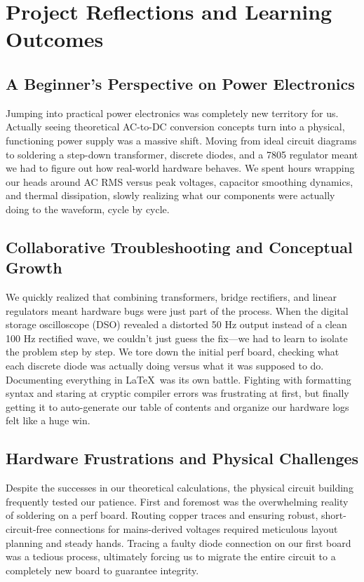 \documentclass[journal,12pt,onecolumn]{IEEEtran}
\begin{document}
		\section{Project Reflections and Learning Outcomes}
		
\subsection{A Beginner's Perspective on Power Electronics}
Jumping into practical power electronics was completely new territory for us. Actually seeing theoretical AC-to-DC conversion concepts turn into a physical, functioning power supply was a massive shift. Moving from ideal circuit diagrams to soldering a step-down transformer, discrete diodes, and a 7805 regulator meant we had to figure out how real-world hardware behaves. We spent hours wrapping our heads around AC RMS versus peak voltages, capacitor smoothing dynamics, and thermal dissipation, slowly realizing what our components were actually doing to the waveform, cycle by cycle.
		
\subsection{Collaborative Troubleshooting and Conceptual Growth}
We quickly realized that combining transformers, bridge rectifiers, and linear regulators meant hardware bugs were just part of the process. When the digital storage oscilloscope (DSO) revealed a distorted 50 Hz output instead of a clean 100 Hz rectified wave, we couldn't just guess the fix---we had to learn to isolate the problem step by step. We tore down the initial perf board, checking what each discrete diode was actually doing versus what it was supposed to do. Documenting everything in \LaTeX\ was its own battle. Fighting with formatting syntax and staring at cryptic compiler errors was frustrating at first, but finally getting it to auto-generate our table of contents and organize our hardware logs felt like a huge win.
		
\subsection{Hardware Frustrations and Physical Challenges}
Despite the successes in our theoretical calculations, the physical circuit building frequently tested our patience. First and foremost was the overwhelming reality of soldering on a perf board. Routing copper traces and ensuring robust, short-circuit-free connections for mains-derived voltages required meticulous layout planning and steady hands. Tracing a faulty diode connection on our first board was a tedious process, ultimately forcing us to migrate the entire circuit to a completely new board to guarantee integrity. 
\end{document}
